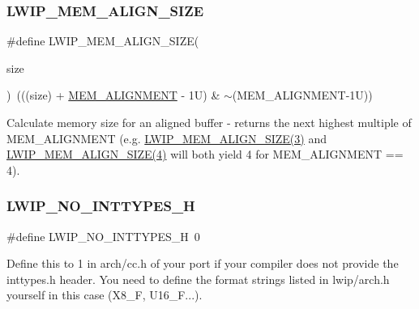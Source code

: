 \subsubsection{\texorpdfstring{L\+W\+I\+P\+\_\+\+M\+E\+M\+\_\+\+A\+L\+I\+G\+N\+\_\+\+S\+I\+ZE}{LWIP\_MEM\_ALIGN\_SIZE}\hspace{0.1cm}{\footnotesize\ttfamily [2/2]}}
{\footnotesize\ttfamily \#define L\+W\+I\+P\+\_\+\+M\+E\+M\+\_\+\+A\+L\+I\+G\+N\+\_\+\+S\+I\+ZE(\begin{DoxyParamCaption}\item[{}]{size }\end{DoxyParamCaption})~(((size) + \hyperlink{group__lwip__opts__mem_ga97343214666ee6dcb18c0bd77b441ea7}{M\+E\+M\+\_\+\+A\+L\+I\+G\+N\+M\+E\+NT} -\/ 1\+U) \& $\sim$(\+M\+E\+M\+\_\+\+A\+L\+I\+G\+N\+M\+E\+N\+T-\/1\+U))}

Calculate memory size for an aligned buffer -\/ returns the next highest multiple of M\+E\+M\+\_\+\+A\+L\+I\+G\+N\+M\+E\+NT (e.\+g. \hyperlink{group__compiler__abstraction_gaef204be511fd32f681b55abc08e9ae18}{L\+W\+I\+P\+\_\+\+M\+E\+M\+\_\+\+A\+L\+I\+G\+N\+\_\+\+S\+I\+Z\+E(3)} and \hyperlink{group__compiler__abstraction_gaef204be511fd32f681b55abc08e9ae18}{L\+W\+I\+P\+\_\+\+M\+E\+M\+\_\+\+A\+L\+I\+G\+N\+\_\+\+S\+I\+Z\+E(4)} will both yield 4 for M\+E\+M\+\_\+\+A\+L\+I\+G\+N\+M\+E\+NT == 4). \mbox{\label{group__compiler__abstraction_ga5bf52d6f2729d0c8afd365f69d7d4373}} 
\subsubsection{\texorpdfstring{L\+W\+I\+P\+\_\+\+N\+O\+\_\+\+I\+N\+T\+T\+Y\+P\+E\+S\+\_\+H}{LWIP\_NO\_INTTYPES\_H}\hspace{0.1cm}{\footnotesize\ttfamily [1/2]}}
{\footnotesize\ttfamily \#define L\+W\+I\+P\+\_\+\+N\+O\+\_\+\+I\+N\+T\+T\+Y\+P\+E\+S\+\_\+H~0}

Define this to 1 in arch/cc.\+h of your port if your compiler does not provide the inttypes.\+h header. You need to define the format strings listed in lwip/arch.\+h yourself in this case (X8\+\_\+F, U16\+\_\+F...). \mbox{\label{group__compiler__abstraction_ga5bf52d6f2729d0c8afd365f69d7d4373}} 
